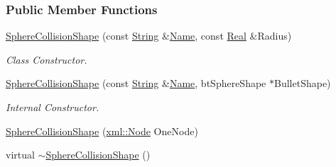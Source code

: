 \subsubsection*{Public Member Functions}
\begin{DoxyCompactItemize}
\item 
\hyperlink{classMezzanine_1_1SphereCollisionShape_ad847ecc1fb38331b3b701d07f86ab29a}{SphereCollisionShape} (const \hyperlink{namespaceMezzanine_acf9fcc130e6ebf08e3d8491aebcf1c86}{String} \&\hyperlink{classMezzanine_1_1CollisionShape_aac524c5c56fa4d158bc071f8aecfbe79}{Name}, const \hyperlink{namespaceMezzanine_a726731b1a7df72bf3583e4a97282c6f6}{Real} \&Radius)
\begin{DoxyCompactList}\small\item\em Class Constructor. \item\end{DoxyCompactList}\item 
\hyperlink{classMezzanine_1_1SphereCollisionShape_a201f7866f6f3ac9dbde386c826797d51}{SphereCollisionShape} (const \hyperlink{namespaceMezzanine_acf9fcc130e6ebf08e3d8491aebcf1c86}{String} \&\hyperlink{classMezzanine_1_1CollisionShape_aac524c5c56fa4d158bc071f8aecfbe79}{Name}, btSphereShape $\ast$BulletShape)
\begin{DoxyCompactList}\small\item\em Internal Constructor. \item\end{DoxyCompactList}\item 
\hyperlink{classMezzanine_1_1SphereCollisionShape_a73550b654650e6fa82bb8bee015f5423}{SphereCollisionShape} (\hyperlink{classMezzanine_1_1xml_1_1Node}{xml::Node} OneNode)
\item 
\hypertarget{classMezzanine_1_1SphereCollisionShape_ad6ffdf8da312eb1eea4b8ef3b6393482}{
virtual \hyperlink{classMezzanine_1_1SphereCollisionShape_ad6ffdf8da312eb1eea4b8ef3b6393482}{$\sim$SphereCollisionShape} ()}
\label{classMezzanine_1_1SphereCollisionShape_ad6ffdf8da312eb1eea4b8ef3b6393482}


\end{DoxyCompactItemize}
